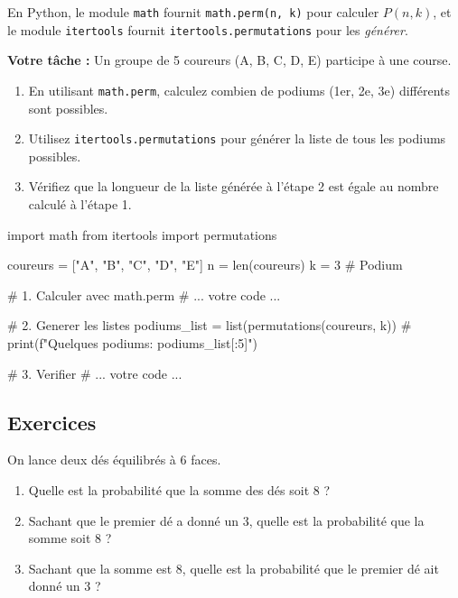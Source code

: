\begin{exercicebox}
En Python, le module \texttt{math} fournit \texttt{math.perm(n, k)} pour calculer $P(n, k)$, et le module \texttt{itertools} fournit \texttt{itertools.permutations} pour les \textit{générer}.

\textbf{Votre tâche :}
Un groupe de 5 coureurs (A, B, C, D, E) participe à une course.
\begin{enumerate}
    \item En utilisant \texttt{math.perm}, calculez combien de podiums (1er, 2e, 3e) différents sont possibles.
    \item Utilisez \texttt{itertools.permutations} pour générer la liste de tous les podiums possibles.
    \item Vérifiez que la longueur de la liste générée à l'étape 2 est égale au nombre calculé à l'étape 1.
\end{enumerate}

\begin{codecell}
import math
from itertools import permutations

coureurs = ["A", "B", "C", "D", "E"]
n = len(coureurs)
k = 3 # Podium

# 1. Calculer avec math.perm
# ... votre code ...

# 2. Generer les listes
podiums_list = list(permutations(coureurs, k))
# print(f"Quelques podiums: {podiums_list[:5]}")

# 3. Verifier
# ... votre code ...
\end{codecell}
\end{exercicebox}



\subsection{Exercices}


\begin{exercicebox}
On lance deux dés équilibrés à 6 faces.
\begin{enumerate}
    \item Quelle est la probabilité que la somme des dés soit 8 ?
    \item Sachant que le premier dé a donné un 3, quelle est la probabilité que la somme soit 8 ?
    \item Sachant que la somme est 8, quelle est la probabilité que le premier dé ait donné un 3 ?
\end{enumerate}
\end{exercicebox}

